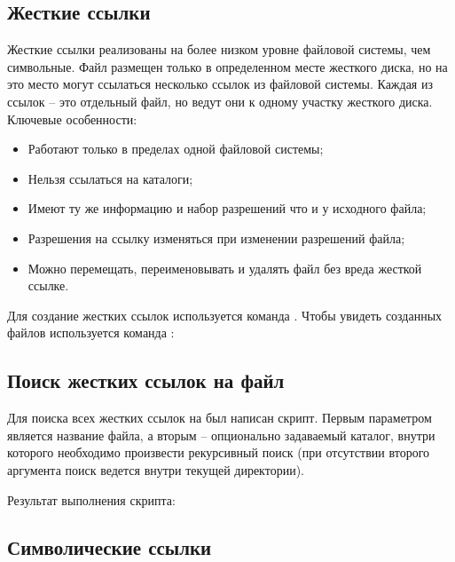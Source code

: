 \subsection{Жесткие ссылки}

Жесткие ссылки реализованы на более низком уровне файловой системы, чем символьные. Файл размещен только в определенном месте жесткого диска, но на это место могут ссылаться несколько ссылок из файловой системы. Каждая из ссылок -- это отдельный файл, но ведут они к одному участку жесткого диска. Ключевые особенности:
\begin{itemize}
	\item Работают только в пределах одной файловой системы;
	\item Нельзя ссылаться на каталоги;
	\item Имеют ту же информацию  и набор разрешений что и у исходного файла;
	\item Разрешения на ссылку изменяться при изменении разрешений файла;
	\item Можно перемещать, переименовывать и удалять файл без вреда жесткой ссылке.
\end{itemize}

Для создание жестких ссылок используется команда . Чтобы увидеть  созданных файлов используется команда :


\subsection{Поиск жестких ссылок на файл}

Для поиска всех жестких ссылок на был написан скрипт. Первым параметром является название файла, а вторым -- опционально задаваемый каталог, внутри которого необходимо произвести рекурсивный поиск (при отсутствии второго аргумента поиск ведется внутри текущей директории).


Результат выполнения скрипта:


\subsection{Символические ссылки}

